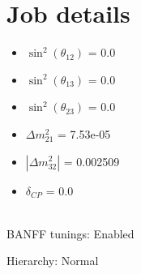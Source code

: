 \documentclass[10pt,a4paper]{article}
\begin{document}
\section*{Job details}


\begin{minipage}[t]{0.5\textwidth}
\begin{itemize}
\item[] $\sin^2(\theta_{12})$ = 0.0
\item[] $\sin^2(\theta_{13})$ = 0.0
\item[] $\sin^2(\theta_{23})$ = 0.0
\item[] $\Delta m^2_{21}$ = 7.53e-05
\item[] $|\Delta m^2_{32}|$ = 0.002509
\item[] $\delta_{CP}$ = 0.0
\end{itemize}
\end{minipage}
\\



BANFF tunings: Enabled

Hierarchy: Normal
\end{document}
